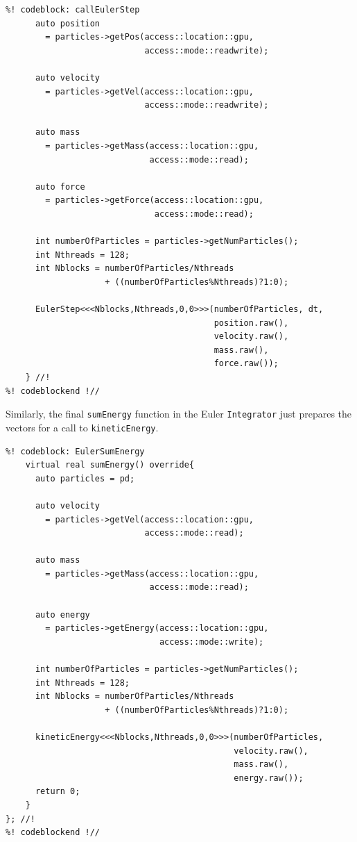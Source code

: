 \begin{lstlisting}
%! codeblock: callEulerStep
      auto position
        = particles->getPos(access::location::gpu,
                            access::mode::readwrite);

      auto velocity
        = particles->getVel(access::location::gpu,
                            access::mode::readwrite);

      auto mass
        = particles->getMass(access::location::gpu,
                             access::mode::read);

      auto force
        = particles->getForce(access::location::gpu,
                              access::mode::read);

      int numberOfParticles = particles->getNumParticles();
      int Nthreads = 128;
      int Nblocks = numberOfParticles/Nthreads
                    + ((numberOfParticles%Nthreads)?1:0);

      EulerStep<<<Nblocks,Nthreads,0,0>>>(numberOfParticles, dt,
                                          position.raw(),
                                          velocity.raw(),
                                          mass.raw(),
                                          force.raw());
    } //!
%! codeblockend !//
\end{lstlisting}

Similarly, the final \texttt{sumEnergy} function in the Euler 
\texttt{Integrator} just prepares the vectors for a call to 
\texttt{kineticEnergy}.
\begin{lstlisting}
%! codeblock: EulerSumEnergy
    virtual real sumEnergy() override{
      auto particles = pd;

      auto velocity
        = particles->getVel(access::location::gpu,
                            access::mode::read);

      auto mass
        = particles->getMass(access::location::gpu,
                             access::mode::read);

      auto energy
        = particles->getEnergy(access::location::gpu,
                               access::mode::write);

      int numberOfParticles = particles->getNumParticles();
      int Nthreads = 128;
      int Nblocks = numberOfParticles/Nthreads
                    + ((numberOfParticles%Nthreads)?1:0);

      kineticEnergy<<<Nblocks,Nthreads,0,0>>>(numberOfParticles,
                                              velocity.raw(),
                                              mass.raw(),
                                              energy.raw());
      return 0;
    }
}; //!
%! codeblockend !//
\end{lstlisting}

